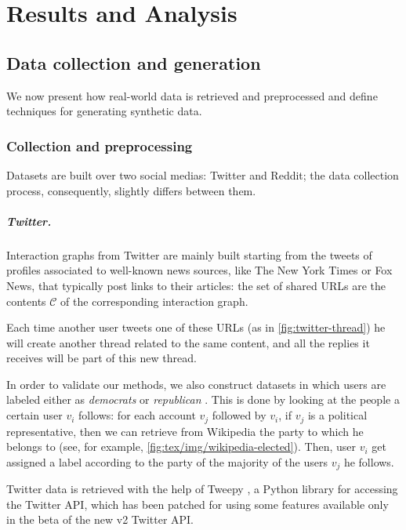 \chapter{Results and Analysis}
\label{ch:resultsAndAnalysis}

\section{Data collection and generation}%
\label{sec:data_collection_and_generation}

We now present how real-world data is retrieved and preprocessed and
define techniques for generating synthetic data.

\subsection{Collection and preprocessing}%
\label{sub:collection_and_preprocessing}

Datasets are built over two social medias: Twitter and Reddit; the data
collection process, consequently, slightly differs between them.

\paragraph{Twitter.}%
\label{par:twitter-data}

Interaction graphs from Twitter are mainly built starting from the tweets
of profiles associated to well-known news sources, like The
New York Times or Fox News, that typically post links to their articles:
the set of shared URLs are the contents $\mathcal{C} $ of the corresponding interaction graph.

Each time another user tweets one of these URLs (as in
\autoref{fig:twitter-thread}) he
will create another thread related to the same content, and all the
replies it receives will be part of this new thread.

In order to validate our methods, we also construct datasets in which users are labeled either as
\emph{democrats} or \emph{republican} \footnotemark. This is done by looking at the people a
certain user $v_i$ follows: for each account $v_j$ followed by $v_i$, if $v_j$ is a political representative, then we can
retrieve from Wikipedia the party to which he belongs to (see, for
example, \autoref{fig:tex/img/wikipedia-elected}). Then, user $v_i$ get assigned a
label according to the party of the majority of the users $v_j$ he
follows.

Twitter data is retrieved with the help of Tweepy \cite{tweepy}, a Python
library for accessing the Twitter API, which has been patched for using some
features available only in the beta of the new v2 Twitter API.

